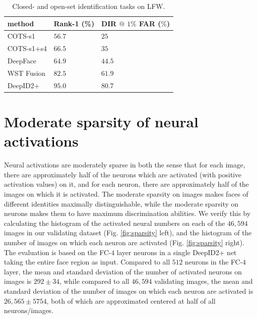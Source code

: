 \documentclass[10pt,twocolumn,letterpaper]{article}
\begin{document}
\begin{table}[t]
\caption{Closed- and open-set identification tasks on LFW. }
\vspace{-0.1in}
\label{tab:lfw_id}
\begin{center}
\begin{tabular}{p{80pt}|p{50pt}|p{50pt}}
\toprule
method & Rank-1 (\%) & DIR $@$ $1\%$ FAR ($\%$) \\
\midrule
COTS-s1 \cite{best-rowden2014} & $56.7$ & $25$ \\
COTS-s1+s4 \cite{best-rowden2014} & $66.5$ & $35$ \\
DeepFace \cite{taigman2014a} & $64.9$ & $44.5$ \\
WST Fusion \cite{taigman2014b} & $82.5$ & $61.9$ \\
DeepID2+ & $\bm{95.0}$ & $\bm{80.7}$ \\
\bottomrule
\end{tabular}
\end{center}
\vspace{-0.1in}
\end{table}


\section{Moderate sparsity of neural activations}

Neural activations are moderately sparse in both the sense that for each image, there are approximately half of the neurons which are activated (with positive activation values) on it, and for each neuron, there are approximately half of the images on which it is activated. The moderate sparsity on images makes faces of different identities maximally distinguishable, while the moderate sparsity on neurons makes them to have maximum discrimination abilities. We verify this by calculating the histogram of the activated neural numbers on each of the $46,594$ images in our validating dataset (Fig. \ref{fig:sparsity} left), and the histogram of the number of images on which each neuron are activated (Fig. \ref{fig:sparsity} right). The evaluation is based on the FC-$4$ layer neurons in a single DeepID2+ net taking the entire face region as input. Compared to all $512$ neurons in the FC-$4$ layer, the mean and standard deviation of the number of activated neurons on images is $292\pm34$, while compared to all $46,594$ validating images, the mean and standard deviation of the number of images on which each neuron are activated is $26,565\pm5754$, both of which are approximated centered at half of all neurons/images.
\end{document}
